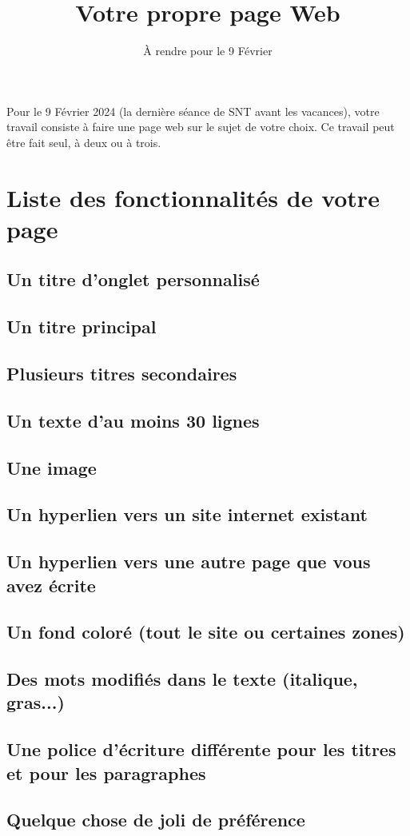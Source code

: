 \documentclass{article}
\title{Votre propre page Web}
\date{À rendre pour le 9 Février}
\author{}
\begin{document}
\maketitle

Pour le 9 Février 2024 (la dernière séance de SNT avant les vacances), votre travail consiste à faire une page web sur le sujet de votre choix. Ce travail peut être fait seul, à deux ou à trois.

\section*{Liste des fonctionnalités de votre page}
\subsection*{Un titre d'onglet personnalisé}
\subsection*{Un titre principal}
\subsection*{Plusieurs titres secondaires}
\subsection*{Un texte d'au moins 30 lignes}
\subsection*{Une image}
\subsection*{Un hyperlien vers un site internet existant}
\subsection*{Un hyperlien vers une autre page que vous avez écrite}
\subsection*{Un fond coloré (tout le site ou certaines zones)}
\subsection*{Des mots modifiés dans le texte (italique, gras...)}
\subsection*{Une police d'écriture différente pour les titres et pour les paragraphes}
\subsection*{Quelque chose de joli de préférence}
\end{document}
